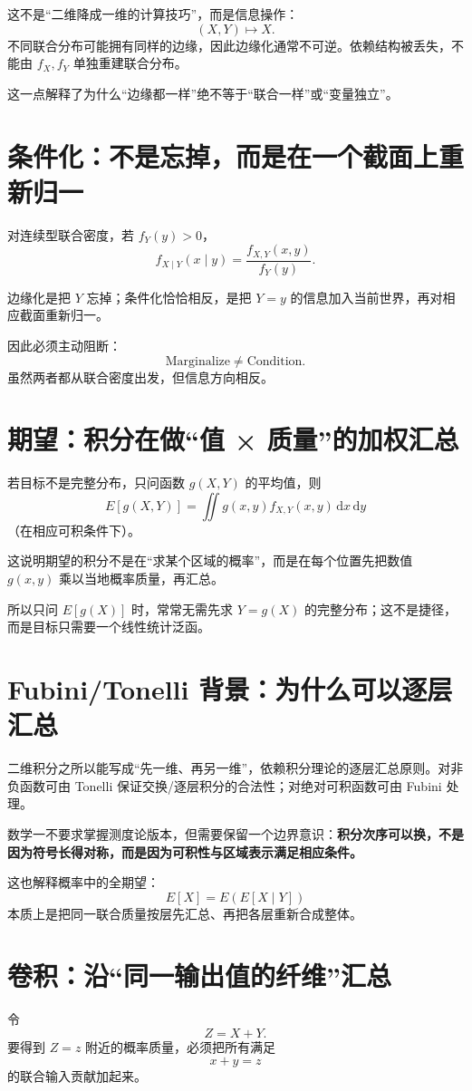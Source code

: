 \documentclass[profile=standard]{ipara-handbook}
\begin{document}
这不是“二维降成一维的计算技巧”，而是信息操作：
\[
(X,Y)\mapsto X.
\]
不同联合分布可能拥有同样的边缘，因此边缘化通常不可逆。依赖结构被丢失，不能由 $f_X,f_Y$ 单独重建联合分布。

这一点解释了为什么“边缘都一样”绝不等于“联合一样”或“变量独立”。

\section{条件化：不是忘掉，而是在一个截面上重新归一}
对连续型联合密度，若 $f_Y(y)>0$，
\[
\boxed{f_{X\mid Y}(x\mid y)=\frac{f_{X,Y}(x,y)}{f_Y(y)}.}
\]

边缘化是把 $Y$ 忘掉；条件化恰恰相反，是把 $Y=y$ 的信息加入当前世界，再对相应截面重新归一。

因此必须主动阻断：
\[
\boxed{\text{Marginalize}\neq\text{Condition}.}
\]
虽然两者都从联合密度出发，但信息方向相反。

\section{期望：积分在做“值 × 质量”的加权汇总}
若目标不是完整分布，只问函数 $g(X,Y)$ 的平均值，则
\[
\boxed{E[g(X,Y)]=\iint g(x,y)f_{X,Y}(x,y)\,\mathrm{d}x\,\mathrm{d}y}
\]
（在相应可积条件下）。

这说明期望的积分不是在“求某个区域的概率”，而是在每个位置先把数值 $g(x,y)$ 乘以当地概率质量，再汇总。

所以只问 $E[g(X)]$ 时，常常无需先求 $Y=g(X)$ 的完整分布；这不是捷径，而是目标只需要一个线性统计泛函。

\section{Fubini/Tonelli 背景：为什么可以逐层汇总}
二维积分之所以能写成“先一维、再另一维”，依赖积分理论的逐层汇总原则。对非负函数可由 Tonelli 保证交换/逐层积分的合法性；对绝对可积函数可由 Fubini 处理。

数学一不要求掌握测度论版本，但需要保留一个边界意识：\textbf{积分次序可以换，不是因为符号长得对称，而是因为可积性与区域表示满足相应条件。}

这也解释概率中的全期望：
\[
E[X]=E(E[X\mid Y])
\]
本质上是把同一联合质量按层先汇总、再把各层重新合成整体。

\section{卷积：沿“同一输出值的纤维”汇总}
令
\[
Z=X+Y.
\]
要得到 $Z=z$ 附近的概率质量，必须把所有满足
\[
x+y=z
\]
的联合输入贡献加起来。
\end{document}

